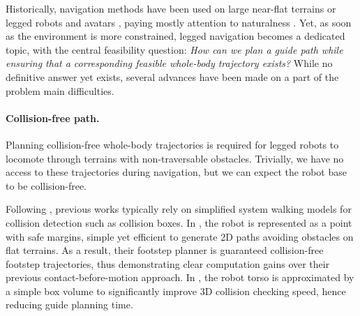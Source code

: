 Historically, navigation methods have been used on large near-flat terrains \cite{Chestnutt2007NavigationPF} or legged robots and avatars \cite{pettre_2_stages_2003}, paying mostly attention to naturalness \cite{isabelle_maroger_2020}. Yet, as soon as the environment is more constrained, legged navigation becomes a dedicated topic, with the central feasibility question: \textit{How can we plan a guide path while ensuring that a corresponding feasible whole-body trajectory exists?}
While no definitive answer yet exists, several advances have been made on a part of the problem main difficulties.



\paragraph{Collision-free path.}
Planning collision-free whole-body trajectories is required for legged robots to locomote through terrains with non-traversable obstacles.
Trivially, we have no access to these trajectories during navigation, but we can expect the robot base to be collision-free.

Following \cite{pettre_2_stages_2003}, previous works typically rely on simplified system walking models for collision detection such as collision boxes.
In \cite{Hildebrandt_lola_2017}, the robot is represented as a point with safe margins, simple yet efficient to generate 2D paths avoiding obstacles on flat terrains.
As a result, their footstep planner is guaranteed collision-free footstep trajectories, thus demonstrating clear computation gains over their previous contact-before-motion approach.
In \cite{rough_terrain_reachability_hutter_2021, lin_traversability_2018, AcyclicCP}, the robot torso is approximated by a simple box volume to significantly improve 3D collision checking speed, hence reducing guide planning time.

